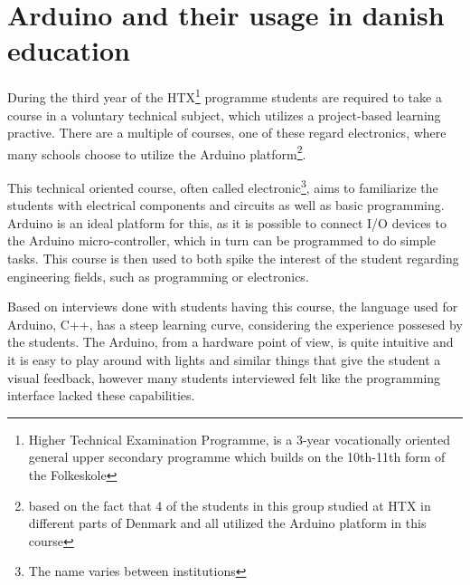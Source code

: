 % 

\section{Arduino and their usage in danish education}
During the third year of the HTX\footnote{Higher Technical Examination Programme, is a 3-year vocationally oriented general upper secondary programme which builds on the 10th-11th form of the Folkeskole\cite{htx_wiki}} programme students are required to take a course in a voluntary technical subject, which utilizes a project-based learning practive. 
There are a multiple of courses, one of these regard electronics, where many schools choose to utilize the Arduino platform\footnote{based on the fact that 4 of the students in this group studied at HTX in different parts of Denmark and all utilized the Arduino platform in this course}\cite{holstebro_education}.  

This technical oriented course, often called electronic\footnote{The name varies between institutions}, aims to familiarize the students with electrical components and circuits as well as basic programming.\cite{holstebro_electronic}
Arduino is an ideal platform for this, as it is possible to connect I/O devices to the Arduino micro-controller, which in turn can be programmed to do simple tasks. 
This course is then used to both spike the interest of the student regarding engineering fields, such as programming or electronics. 

Based on interviews done with students having this course, the language used for Arduino, C++, has a steep learning curve, considering the experience possesed by the students.
The Arduino, from a hardware point of view, is quite intuitive and it is easy to play around with lights and similar things that give the student a visual feedback, however many students interviewed felt like the programming interface lacked these capabilities. 
\cite{Interviews}%


